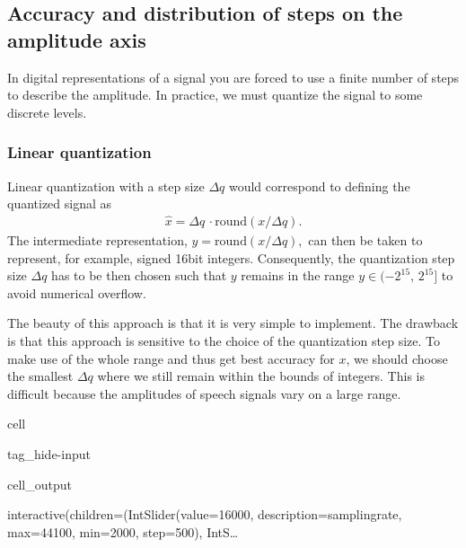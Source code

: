 \documentclass[letterpaper,10pt,english]{jupyterBook}
\begin{document}
\subsection{Accuracy and distribution of steps on the amplitude axis}
\label{\detokenize{Representations/Waveform:accuracy-and-distribution-of-steps-on-the-amplitude-axis}}
\sphinxAtStartPar
In digital representations of a signal you are forced to use a finite
number of steps to describe the amplitude. In practice, we must quantize
the signal to some discrete levels.


\subsubsection{Linear quantization}
\label{\detokenize{Representations/Waveform:linear-quantization}}
\sphinxAtStartPar
Linear quantization with a step size \(\Delta q \) would correspond
to defining the quantized signal as
\begin{equation*}
\begin{split} 
\hat x = \Delta q\,\cdot {\mathrm{round}}(x/\Delta q). 
\end{split}
\end{equation*}
\sphinxAtStartPar
The intermediate representation, \( y={\mathrm{round}}(x/\Delta q),\)
can then be taken to represent, for example, signed 16\sphinxhyphen{}bit integers.
Consequently, the quantization step size  \( \Delta q \) has to be
then chosen such that \(y\) remains in the range  \(
y\in(-2^{15},\,2^{15}] \) to avoid numerical overflow.

\sphinxAtStartPar
The beauty of this approach is that it is very simple to implement. The
drawback is that this approach is sensitive to the choice of the
quantization step size. To make use of the whole range and thus get best
accuracy for \(x\), we should choose the smallest  \( \Delta q \) where
we still remain within the bounds of integers. This is difficult because
the amplitudes of speech signals vary on a large range.

\sphinxAtStartPar
{}

\begin{sphinxuseclass}{cell}
\begin{sphinxuseclass}{tag_hide-input}\begin{sphinxVerbatimOutput}

\begin{sphinxuseclass}{cell_output}
\begin{sphinxVerbatim}[commandchars=\\\{\}]
interactive(children=(IntSlider(value=16000, description=\PYGZsq{}sampling\PYGZus{}rate\PYGZsq{}, max=44100, min=2000, step=500), IntS…
\end{sphinxVerbatim}

\end{sphinxuseclass}\end{sphinxVerbatimOutput}

\end{sphinxuseclass}
\end{sphinxuseclass}
\end{document}
